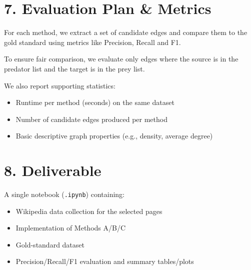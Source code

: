 \documentclass[11pt,a4paper]{article}
\begin{document}
\section*{7. Evaluation Plan \& Metrics}
For each method, we extract a set of candidate edges and compare them to the gold standard using metrics like Precision, Recall and F1.

To ensure fair comparison, we evaluate only edges where the source is in the predator list and the target is in the prey list.

We also report supporting statistics:
\begin{itemize}[leftmargin=*,nosep]
  \item Runtime per method (seconds) on the same dataset
  \item Number of candidate edges produced per method
  \item Basic descriptive graph properties (e.g., density, average degree)
\end{itemize}

\section*{8. Deliverable}
A single notebook (\texttt{.ipynb}) containing:
\begin{itemize}[leftmargin=*,nosep]
  \item Wikipedia data collection for the selected pages
  \item Implementation of Methods A/B/C
  \item Gold-standard dataset
  \item Precision/Recall/F1 evaluation and summary tables/plots
\end{itemize}
\end{document}
